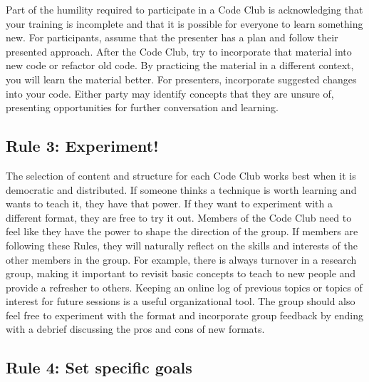 \documentclass[
  11pt,
]{article}
\begin{document}
Part of the humility required to participate in a Code Club is
acknowledging that your training is incomplete and that it is possible
for everyone to learn something new. For participants, assume that the
presenter has a plan and follow their presented approach. After the Code
Club, try to incorporate that material into new code or refactor old
code. By practicing the material in a different context, you will learn
the material better. For presenters, incorporate suggested changes into
your code. Either party may identify concepts that they are unsure of,
presenting opportunities for further conversation and learning.

\hypertarget{rule-3-experiment}{%
\subsection{Rule 3: Experiment!}\label{rule-3-experiment}}

The selection of content and structure for each Code Club works best
when it is democratic and distributed. If someone thinks a technique is
worth learning and wants to teach it, they have that power. If they want
to experiment with a different format, they are free to try it out.
Members of the Code Club need to feel like they have the power to shape
the direction of the group. If members are following these Rules, they
will naturally reflect on the skills and interests of the other members
in the group. For example, there is always turnover in a research group,
making it important to revisit basic concepts to teach to new people and
provide a refresher to others. Keeping an online log of previous topics
or topics of interest for future sessions is a useful organizational
tool. The group should also feel free to experiment with the format and
incorporate group feedback by ending with a debrief discussing the pros
and cons of new formats.

\hypertarget{rule-4-set-specific-goals}{%
\subsection{Rule 4: Set specific
goals}\label{rule-4-set-specific-goals}}
\end{document}

